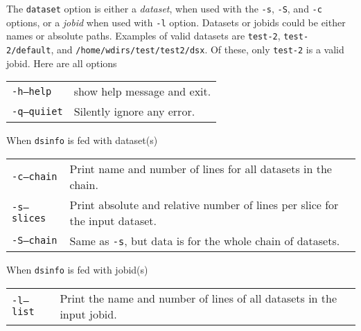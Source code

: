 The \texttt{dataset} option is either a \textsl{dataset}, when used
with the \texttt{-s}, \texttt{-S}, and \texttt{-c} options, or a
\textsl{jobid} when used with \texttt{-l} option.  Datasets or jobids
could be either names or absolute paths.  Examples of valid datasets
are \texttt{test-2}, \texttt{test-2/default}, and
\texttt{/home/wdirs/test/test2/dsx}.  Of these, only \texttt{test-2}
is a valid jobid.  Here are all options
\begin{snugshade}
\begin{tabular}{p{4cm}p{9cm}}
  \texttt{-h}\hspace{3cm}\texttt{---help} & show help message and exit.\\[4ex]
  \texttt{-q}\hspace{3cm}\texttt{---quiiet} & Silently ignore any error.\\
\end{tabular}
\end{snugshade}
When \texttt{dsinfo} is fed with dataset(s)
\begin{snugshade}
\begin{tabular}{p{4cm}p{9cm}}
  \texttt{-c}\hspace{3cm}\texttt{---chain} & Print name and number of
  lines for all datasets in the chain.\\[4ex]
  \texttt{-s}\hspace{3cm}\texttt{---slices} & Print absolute and
  relative number of lines per slice for the input dataset.\\[4ex]
  \texttt{-S}\hspace{3cm}\texttt{---chain} & Same as \texttt{-s}, but
  data is for the whole chain of datasets.\\
\end{tabular}
\end{snugshade}
When \texttt{dsinfo} is fed with jobid(s)
\begin{snugshade}
\begin{tabular}{p{4cm}p{9cm}}
  \texttt{-l}\hspace{3cm}\texttt{---list} & Print the name and number
  of lines of all datasets in the input jobid.\\
\end{tabular}
\end{snugshade}

